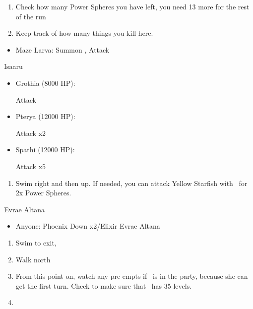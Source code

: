 \begin{enumerate}[resume]
	\item Check how many Power Spheres you have left, you need 13 more for the rest of the run
	\item Keep track of how many things you kill here.
\end{enumerate}
\begin{encounters}
\begin{itemize}
	\item Maze Larva: Summon \ixilon, Attack
\end{itemize}
\end{encounters}
\begin{battle}{Isaaru}
\begin{itemize}
	\item Grothia (8000 HP):
	\begin{itemize}
		\summon{\bahamut}
		\bahamutf Attack
	\end{itemize}
	\item Pterya (12000 HP):
	\begin{itemize}
		\summon{\bahamut}
		\bahamutf Attack x2
	\end{itemize}
	\item Spathi (12000 HP):
	\begin{itemize}
		\summon{\ixilon}
		\ixilonf Attack x5
	\end{itemize}
\end{itemize}
\end{battle}
\begin{enumerate}[resume]
	\item Swim right and then up. If needed, you can attack Yellow Starfish with \tidus\ for 2x Power Spheres.
\end{enumerate}
\begin{battle}{Evrae Altana}
\begin{itemize}
	\item Anyone: Phoenix Down x2/Elixir Evrae Altana
\end{itemize}
\end{battle}
\begin{enumerate}[resume]
	\item Swim to exit, \sd
	\item Walk north
	\item From this point on, watch any pre-empts if \yuna\ is in the party, because she can get the first turn. Check to make sure that \lulu\ has 35 levels.
	\item \formation{\tidus}{\yuna}{\auron}
\end{enumerate}
